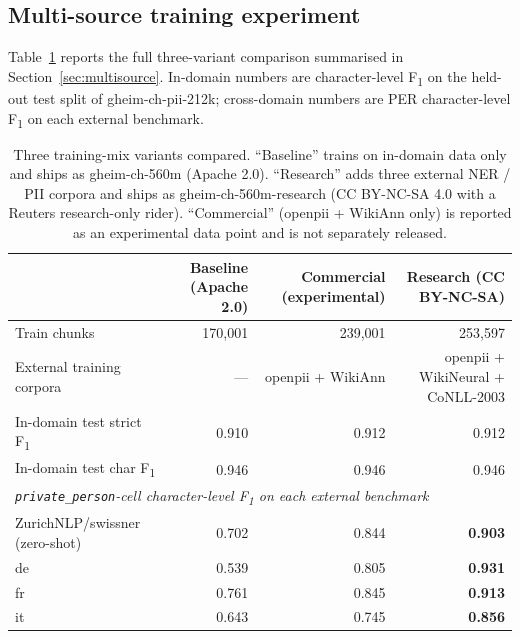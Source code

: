 \documentclass[sigconf,nonacm]{acmart}
\begin{document}
\clearpage
\subsection{Multi-source training experiment}
\label{app:multisource}

Table~\ref{tab:multisource} reports the full three-variant
comparison summarised in Section~\ref{sec:multisource}. In-domain
numbers are character-level F\textsubscript{1} on the held-out
test split of \textsf{gheim-ch-pii-212k}; cross-domain numbers are
PER character-level F\textsubscript{1} on each external benchmark.

\begin{table}[!htbp]
\centering
\caption{Three training-mix variants compared. ``Baseline''
trains on in-domain data only and ships as
\textsf{gheim-ch-560m} (Apache 2.0). ``Research'' adds three
external NER / PII corpora and ships as
\textsf{gheim-ch-560m-research} (CC BY-NC-SA 4.0 with a Reuters
research-only rider). ``Commercial'' (openpii + WikiAnn only)
is reported as an experimental data point and is not separately
released.}
\label{tab:multisource}
\small
\begin{tabular}{l r r r}
\toprule
                                                & Baseline (Apache 2.0) & Commercial (experimental) & Research (CC BY-NC-SA) \\
\midrule
Train chunks                                    & 170{,}001 & 239{,}001 & 253{,}597 \\
External training corpora                       & ---       & openpii + WikiAnn & openpii + WikiNeural + CoNLL-2003 \\
\midrule
In-domain test strict F\textsubscript{1}        & 0.910     & 0.912     & 0.912     \\
In-domain test char F\textsubscript{1}          & 0.946     & 0.946     & 0.946     \\
\midrule
\multicolumn{4}{l}{\emph{\texttt{private\_person}-cell character-level F\textsubscript{1} on each external benchmark}} \\
\textsf{ZurichNLP/swissner} (zero-shot)          & 0.702     & 0.844     & \textbf{0.903} \\
\quad de                                        & 0.539     & 0.805     & \textbf{0.931} \\
\quad fr                                        & 0.761     & 0.845     & \textbf{0.913} \\
\quad it                                        & 0.643     & 0.745     & \textbf{0.856} \\

\end{tabular}
\end{table}
\end{document}
